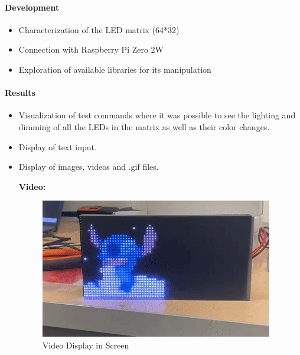 \documentclass{article}
\begin{document}
\paragraph[short]{Development}
\begin{itemize}
    \item Characterization of the LED matrix (64*32)
    \item Connection with Raspberry Pi Zero 2W
    \item Exploration of available libraries for its manipulation
\end{itemize}



\paragraph[short]{Results}
\begin{itemize}
    \item Visualization of test commands where it was possible to see the lighting and dimming of all the LEDs in the matrix as well as their color changes.
    \item Display of text input.
    \item Display of images, videos and .gif files.
    
    \textbf{Video: }

    \begin{figure}[H]
        \centering
        \includegraphics[width=\linewidth]{Images/Screen/Screen1.jpg}
        \caption{Video Display in Screen}
    \end{figure}
\end{itemize}
\end{document}
